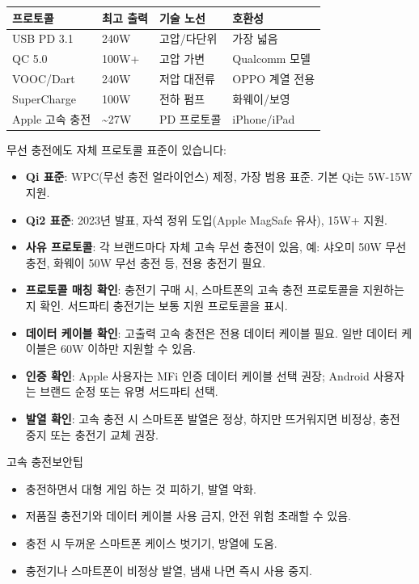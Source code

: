 
\begin{center}
\begin{tabularx}{\linewidth}{|X|X|X|X|}
\hline
\textbf{프로토콜} & \textbf{최고 출력} & \textbf{기술 노선} & \textbf{호환성} \tabularnewline
\hline
USB PD 3.1 & 240W & 고압/다단위 & 가장 넓음 \tabularnewline
QC 5.0 & 100W+ & 고압 가변 & Qualcomm 모델 \tabularnewline
VOOC/Dart & 240W & 저압 대전류 & OPPO 계열 전용 \tabularnewline
SuperCharge & 100W & 전하 펌프 & 화웨이/보영 \tabularnewline
Apple 고속 충전 & \textasciitilde{}27W & PD 프로토콜 & iPhone/iPad \tabularnewline
\hline
\end{tabularx}
\end{center}


무선 충전에도 자체 프로토콜 표준이 있습니다:

\begin{itemize}
  \item \textbf{Qi 표준}: WPC(무선 충전 얼라이언스) 제정, 가장 범용 표준. 기본 Qi는 5W-15W 지원.
  \item \textbf{Qi2 표준}: 2023년 발표, 자석 정위 도입(Apple MagSafe 유사), 15W+ 지원.
  \item \textbf{사유 프로토콜}: 각 브랜드마다 자체 고속 무선 충전이 있음, 예: 샤오미 50W 무선 충전, 화웨이 50W 무선 충전 등, 전용 충전기 필요.
\end{itemize}


\begin{itemize}
  \item \textbf{프로토콜 매칭 확인}: 충전기 구매 시, 스마트폰의 고속 충전 프로토콜을 지원하는지 확인. 서드파티 충전기는 보통 지원 프로토콜을 표시.
  \item \textbf{데이터 케이블 확인}: 고출력 고속 충전은 전용 데이터 케이블 필요. 일반 데이터 케이블은 60W 이하만 지원할 수 있음.
  \item \textbf{인증 확인}: Apple 사용자는 MFi 인증 데이터 케이블 선택 권장; Android 사용자는 브랜드 순정 또는 유명 서드파티 선택.
  \item \textbf{발열 확인}: 고속 충전 시 스마트폰 발열은 정상, 하지만 뜨거워지면 비정상, 충전 중지 또는 충전기 교체 권장.
\end{itemize}

\begin{tcbwarn}{고속 충전보안팁}
\begin{itemize}
  \item 충전하면서 대형 게임 하는 것 피하기, 발열 악화.
  \item 저품질 충전기와 데이터 케이블 사용 금지, 안전 위험 초래할 수 있음.
  \item 충전 시 두꺼운 스마트폰 케이스 벗기기, 방열에 도움.
  \item 충전기나 스마트폰이 비정상 발열, 냄새 나면 즉시 사용 중지.
\end{itemize}

\end{tcbwarn}

